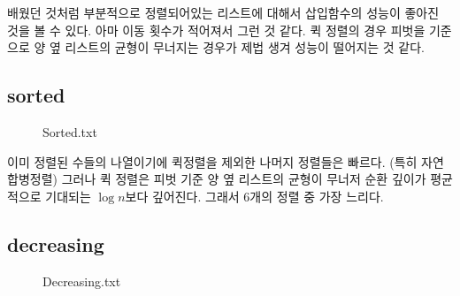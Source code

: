 \documentclass[a4paper,11pt]{article}
\begin{document}
배웠던 것처럼 부분적으로 정렬되어있는 리스트에 대해서 삽입함수의 성능이 좋아진 것을 볼 수 있다. 아마 이동 횟수가 적어져서 그런 것 같다. 퀵 정렬의 경우 피벗을 기준으로 양 옆 리스트의 균형이 무너지는 경우가 제법 생겨 성능이 떨어지는 것 같다.
\newpage
\subsection{sorted}
\begin{figure}[h]
\caption{Sorted.txt}
\label{fig:fig3}
\end{figure}

이미 정렬된 수들의 나열이기에 퀵정렬을 제외한 나머지 정렬들은 빠르다. (특히 자연합병정렬) 그러나 퀵 정렬은 피벗 기준 양 옆 리스트의 균형이 무너저 순환 깊이가 평균적으로 기대되는 $\log n$보다 깊어진다. 그래서 6개의 정렬 중 가장 느리다. 

\subsection{decreasing}
\begin{figure}[h]
\caption{Decreasing.txt}
\label{fig:fig4}
\end{figure}
 
\end{document}
